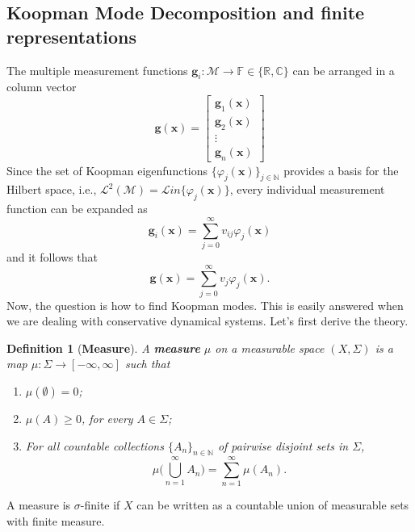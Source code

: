 \documentclass[]{article}
\newtheorem{definition}{Definition}
\begin{document}
\subsection{Koopman Mode Decomposition and finite representations}
The multiple measurement functions $\textbf{g}_i:\mathcal{M} \to \mathbb{F} \in \{\mathbb{R}, \mathbb{C}\}$ can be arranged in a column vector
\begin{equation}
	\textbf{g}(\textbf{x}) = \begin{bmatrix}
		\textbf{g}_1(\textbf{x}) \\
		\textbf{g}_2(\textbf{x}) \\
		\vdots \\
		\textbf{g}_n(\textbf{x})
	\end{bmatrix}
\end{equation}
Since the set of Koopman eigenfunctions $\{\varphi_j(\textbf{x})\}_{j \in \mathbb{N}}$ provides a basis for the Hilbert space, i.e., $\mathcal{L}^2(\mathcal{M}) = \mathcal{L}in\{\varphi_j(\textbf{x})\}$, every individual measurement function can be expanded as 
\begin{equation}
	\textbf{g}_i(\textbf{x}) = \sum_{j=0}^{\infty} v_{ij} \varphi_j(\textbf{x})
\end{equation}
and it follows that
\begin{equation}
	\textbf{g}(\textbf{x}) = \sum_{j=0}^{\infty} v_j \varphi_j(\textbf{x}).
\end{equation}
Now, the question is how to find Koopman modes. This is easily answered when we are dealing with conservative dynamical systems. Let's first derive the theory.
\begin{definition}[\textbf{Measure}]
A \textbf{measure} $\mu$ on a measurable space $(X,\Sigma)$ is a map $\mu:\Sigma \to [-\infty,\infty]$ such that
\begin{enumerate}
	\item $\mu(\emptyset)=0$;
	\item $\mu(A) \geq 0$, for every $A \in \Sigma$;
	\item For all countable collections $\{A_n\}_{n \in \mathbb{N}}$ of pairwise disjoint sets in $\Sigma$,
	\begin{equation}
		\mu\bigg(\bigcup_{n=1}^{\infty} A_n\bigg) = \sum_{n=1}^{\infty} \mu(A_n).
	\end{equation}
\end{enumerate}
\end{definition}
A measure is $\sigma$-finite if $X$ can be written as a countable union of measurable sets with finite measure.
\end{document}
